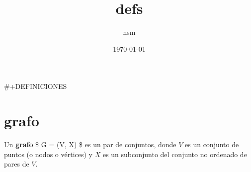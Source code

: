 \documentclass[11pt]{article}
\author{nsm}
\date{\today}
\title{defs}
\begin{document}
\maketitle
\tableofcontents

\#+DEFINICIONES

\section{grafo}
\label{sec-1}
Un \textbf{grafo} \$ G = (V, X) \$ es un par de conjuntos, donde $V$ es un
conjunto de puntos (o nodos o vértices) y $X$ es un subconjunto del
conjunto no ordenado de pares de $V$.
\end{document}
